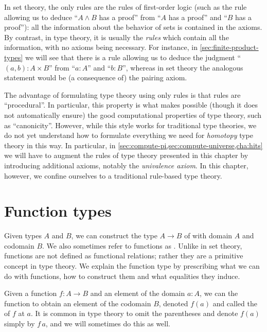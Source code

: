In set theory, the only rules are the rules of first-order logic (such as the rule allowing us to deduce ``$A\wedge B$ has a proof'' from ``$A$ has a proof'' and ``$B$ has a proof''): all the information about the behavior of sets is contained in the axioms.
By contrast, in type theory, it is usually the \emph{rules} which contain all the information, with no axioms being necessary.
For instance, in \cref{sec:finite-product-types} we will see that there is a rule allowing us to deduce the judgment ``$(a,b):A\times B$'' from ``$a:A$'' and ``$b:B$'', whereas in set theory the analogous statement would be (a consequence of) the pairing axiom.

The advantage of formulating type theory using only rules is that rules are ``procedural''.
In particular, this property is what makes possible (though it does not automatically ensure) the good computational properties of type theory, such as ``canonicity''.
However, while this style works for traditional type theories, we do not yet understand how to formulate everything we need for \emph{homotopy} type theory in this way.
In particular, in \cref{sec:compute-pi,sec:compute-universe,cha:hits} we will have to augment the rules of type theory presented in this chapter by introducing additional axioms, notably the \emph{univalence axiom}.
In this chapter, however, we confine ourselves to a traditional rule-based type theory.


\section{Function types}
\label{sec:function-types}

%
%
Given types $A$ and $B$, we can construct the type $A \to B$ of 
%
%
%
with domain $A$ and codomain $B$.
We also sometimes refer to functions as .
%
%
%
%
%
Unlike in set theory, functions are not defined as
functional relations; rather they are a primitive concept in type theory.
We explain the function type by prescribing what we can do with functions, 
how to construct them and what equalities they induce.

Given a function $f : A \to B$ and an element of the domain $a : A$, we
can 
%
%
the function to obtain an element of the codomain $B$,
denoted $f(a)$ and called the  of $f$ at $a$.
%
It is common in type theory to omit the parentheses and denote $f(a)$ simply by $f\,a$, and we will sometimes do this as well.

